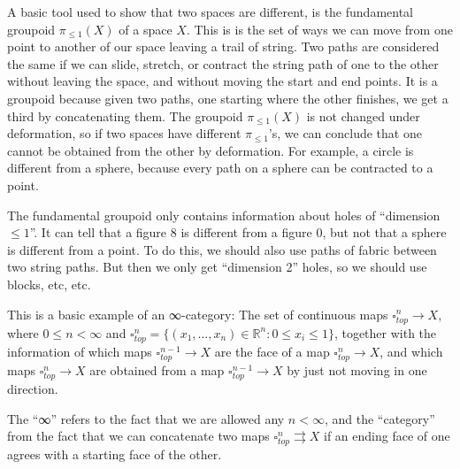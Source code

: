 \documentclass[a4paper]{amsart}
\numberwithin{figure}{section}
\theoremstyle{theorem}
\theoremstyle{definition}
\newcommand{\RR}{\mathbb{R}}
\begin{document}
A basic tool used to show that two spaces are different, is the fundamental groupoid $\pi_{\leq 1}(X)$ of a space $X$. This is is the set of ways we can move from one point to another of our space leaving a trail of string. Two paths are considered the same if we can slide, stretch, or contract the string path of one to the other without leaving the space, and without moving the start and end points. It is a groupoid because given two paths, one starting where the other finishes, we get a third by concatenating them. The groupoid $\pi_{\leq 1}(X)$ is not changed under deformation, so if two spaces have different $\pi_{\leq 1}$'s, we can conclude that one cannot be obtained from the other by deformation. For example, a circle is different from a sphere, because every path on a sphere can be contracted to a point.


The fundamental groupoid only contains information about holes of ``dimension  $\leq 1$''. It can tell that a figure 8 is different from a figure 0, but not that a sphere is different from a point. To do this, we should also use paths of fabric between two string paths. But then we only get ``dimension 2'' holes, so we should use blocks, etc, etc. 

This is a basic example of an ∞-category: The set of continuous maps $\square^n_{top} \to X$, where $0 \leq n < \infty$ and $\square^n_{top} = \{ (x_1, \dots, x_n) \in \RR^n : 0 \leq x_i \leq 1 \}$, together with the information of which maps $\square^{n-1}_{top} {\to} X$ are the face of a map $\square^n_{top} {\to} X$, and which maps $\square^n_{top} {\to} X$ are obtained from a map $\square^{n-1}_{top} {\to} X$ by just not moving in one direction.

The ``∞'' refers to the fact that we are allowed any $n < \infty$, and the ``category'' from the fact that we can concatenate two maps $\square^n_{top} {\rightrightarrows} X$ if an ending face of one agrees with a starting face of the other.

\end{document}
